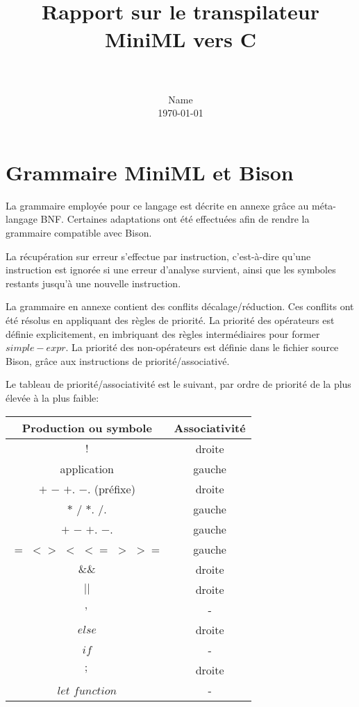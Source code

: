 \documentclass[paper=a4, fontsize=11pt]{scrartcl}
\title{
		\vspace{-1in} 	
		\usefont{OT1}{bch}{b}{n}
		\horrule{0.5pt} \\[0.4cm]
		\huge Rapport sur le transpilateur MiniML vers C \\
		\horrule{2pt} \\[0.5cm]
}
\author{
		\normalfont 								\normalsize
        Name \\[-3pt]		\normalsize
        \today
}
\date{}
\numberwithin{equation}{section}		%
\numberwithin{figure}{section}			%
\numberwithin{table}{section}				%
\begin{document}
\maketitle

\section{Grammaire MiniML et Bison}

La grammaire employée pour ce langage est décrite en annexe grâce au méta-langage BNF.
Certaines adaptations ont été effectuées afin de rendre la grammaire compatible avec Bison.

La récupération sur erreur s'effectue par instruction, c'est-à-dire qu'une instruction est ignorée si une erreur d'analyse survient, ainsi que les symboles restants jusqu'à une nouvelle instruction.

La grammaire en annexe contient des conflits décalage/réduction.
Ces conflits ont été résolus en appliquant des règles de priorité.
La priorité des opérateurs est définie explicitement, en imbriquant des règles intermédiaires pour former $simple-expr$.
La priorité des non-opérateurs est définie dans le fichier source Bison, grâce aux instructions de priorité/associativé.

Le tableau de priorité/associativité est le suivant, par ordre de priorité de la plus élevée à la plus faible:

\begin{center}
\begin{tabular}{ | c | c | }
\hline
Production ou symbole & Associativité \\ \hline
$!$ 							& droite \\ 
application						& gauche \\ 
$+$ $-$ $+.$ $-.$ (préfixe)		& droite \\ 
$*$ $/$ $*.$ $/.$ 				& gauche \\ 
$+$ $-$ $+.$ $-.$				& gauche \\ 
$=$ $<>$ $<$ $<=$ $>$ $>=$		& gauche \\ 
$\&\&$							& droite \\ 
$||$							& droite \\ 
$,$								& - \\ 
$else$							& droite \\ 
$if$							& - \\ 
$;$								& droite \\ 
$let$ $function$				& - \\
\hline
\end{tabular}
\end{center}
\end{document}
